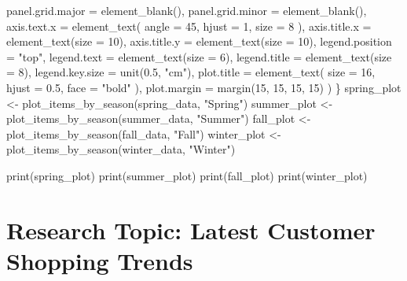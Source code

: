 \documentclass[
  letterpaper,
  DIV=11,
  numbers=noendperiod]{scrartcl}
\newenvironment{Shaded}{\begin{snugshade}}{\end{snugshade}}
\newcommand{\AttributeTok}[1]{\textcolor[rgb]{0.40,0.45,0.13}{#1}}
\newcommand{\DecValTok}[1]{\textcolor[rgb]{0.68,0.00,0.00}{#1}}
\newcommand{\FloatTok}[1]{\textcolor[rgb]{0.68,0.00,0.00}{#1}}
\newcommand{\FunctionTok}[1]{\textcolor[rgb]{0.28,0.35,0.67}{#1}}
\newcommand{\NormalTok}[1]{\textcolor[rgb]{0.00,0.23,0.31}{#1}}
\newcommand{\OtherTok}[1]{\textcolor[rgb]{0.00,0.23,0.31}{#1}}
\newcommand{\StringTok}[1]{\textcolor[rgb]{0.13,0.47,0.30}{#1}}
\begin{document}
\begin{Shaded}
\begin{Highlighting}[]
    \AttributeTok{panel.grid.major =} \FunctionTok{element\_blank}\NormalTok{(), }
    \AttributeTok{panel.grid.minor =} \FunctionTok{element\_blank}\NormalTok{(), }
    \AttributeTok{axis.text.x =} \FunctionTok{element\_text}\NormalTok{(}
      \AttributeTok{angle =} \DecValTok{45}\NormalTok{, }
      \AttributeTok{hjust =} \DecValTok{1}\NormalTok{, }
      \AttributeTok{size =} \DecValTok{8}
\NormalTok{    ), }
    \AttributeTok{axis.title.x =} \FunctionTok{element\_text}\NormalTok{(}\AttributeTok{size =} \DecValTok{10}\NormalTok{),}
    \AttributeTok{axis.title.y =} \FunctionTok{element\_text}\NormalTok{(}\AttributeTok{size =} \DecValTok{10}\NormalTok{),}
    \AttributeTok{legend.position =} \StringTok{"top"}\NormalTok{,}
    \AttributeTok{legend.text =} \FunctionTok{element\_text}\NormalTok{(}\AttributeTok{size =} \DecValTok{6}\NormalTok{),}
    \AttributeTok{legend.title =} \FunctionTok{element\_text}\NormalTok{(}\AttributeTok{size =} \DecValTok{8}\NormalTok{), }
    \AttributeTok{legend.key.size =} \FunctionTok{unit}\NormalTok{(}\FloatTok{0.5}\NormalTok{, }\StringTok{"cm"}\NormalTok{),}
    \AttributeTok{plot.title =} \FunctionTok{element\_text}\NormalTok{(}
      \AttributeTok{size =} \DecValTok{16}\NormalTok{, }
      \AttributeTok{hjust =} \FloatTok{0.5}\NormalTok{, }
      \AttributeTok{face =} \StringTok{"bold"}
\NormalTok{    ), }
    \AttributeTok{plot.margin =} \FunctionTok{margin}\NormalTok{(}\DecValTok{15}\NormalTok{, }\DecValTok{15}\NormalTok{, }\DecValTok{15}\NormalTok{, }\DecValTok{15}\NormalTok{)}
\NormalTok{  )}
\NormalTok{\}}
\NormalTok{spring\_plot }\OtherTok{\textless{}{-}} \FunctionTok{plot\_items\_by\_season}\NormalTok{(spring\_data, }\StringTok{"Spring"}\NormalTok{)}
\NormalTok{summer\_plot }\OtherTok{\textless{}{-}} \FunctionTok{plot\_items\_by\_season}\NormalTok{(summer\_data, }\StringTok{"Summer"}\NormalTok{)}
\NormalTok{fall\_plot }\OtherTok{\textless{}{-}} \FunctionTok{plot\_items\_by\_season}\NormalTok{(fall\_data, }\StringTok{"Fall"}\NormalTok{)}
\NormalTok{winter\_plot }\OtherTok{\textless{}{-}} \FunctionTok{plot\_items\_by\_season}\NormalTok{(winter\_data, }\StringTok{"Winter"}\NormalTok{)}

\FunctionTok{print}\NormalTok{(spring\_plot)}
\FunctionTok{print}\NormalTok{(summer\_plot)}
\FunctionTok{print}\NormalTok{(fall\_plot)}
\FunctionTok{print}\NormalTok{(winter\_plot)}
\end{Highlighting}
\end{Shaded}

\section{\texorpdfstring{\textbf{Research Topic: Latest Customer
Shopping
Trends}}{Research Topic: Latest Customer Shopping Trends}}\label{research-topic-latest-customer-shopping-trends}
\end{document}
